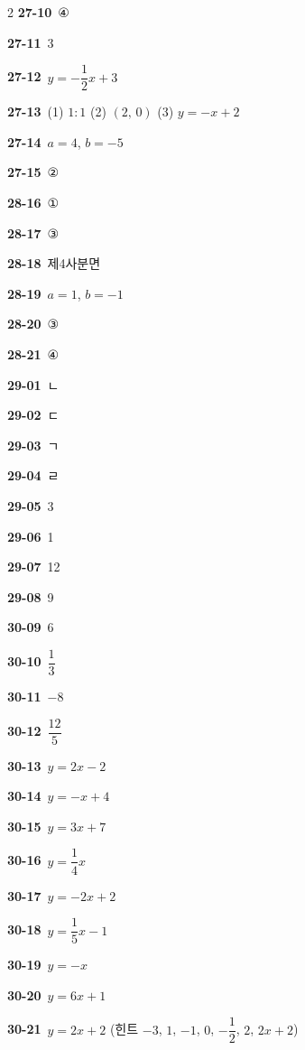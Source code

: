 \documentclass[10pt,a4paper]{article}
\begin{document}
\begin{multicols}{2}
\noindent\textbf{27-10}\ ④\par
\noindent\textbf{27-11}\ 3\par
\noindent\textbf{27-12}\ $y=-\dfrac{1}{2}x+3$\par
\noindent\textbf{27-13}\ (1) $1:1$ (2) $(2,\,0)$ (3) $y=-x+2$\par
\noindent\textbf{27-14}\ $a=4$, $b=-5$\par
\noindent\textbf{27-15}\ ②\par
\noindent\textbf{28-16}\ ①\par
\noindent\textbf{28-17}\ ③\par
\noindent\textbf{28-18}\ 제4사분면\par
\noindent\textbf{28-19}\ $a=1$, $b=-1$\par
\noindent\textbf{28-20}\ ③\par
\noindent\textbf{28-21}\ ④\par
\noindent\textbf{29-01}\ ㄴ\par
\noindent\textbf{29-02}\ ㄷ\par
\noindent\textbf{29-03}\ ㄱ\par
\noindent\textbf{29-04}\ ㄹ\par
\noindent\textbf{29-05}\ 3\par
\noindent\textbf{29-06}\ 1\par
\noindent\textbf{29-07}\ 12\par
\noindent\textbf{29-08}\ 9\par
\noindent\textbf{30-09}\ 6\par
\noindent\textbf{30-10}\ $\dfrac{1}{3}$\par
\noindent\textbf{30-11}\ $-8$\par
\noindent\textbf{30-12}\ $\dfrac{12}{5}$\par
\noindent\textbf{30-13}\ $y=2x-2$\par
\noindent\textbf{30-14}\ $y=-x+4$\par
\noindent\textbf{30-15}\ $y=3x+7$\par
\noindent\textbf{30-16}\ $y=\dfrac{1}{4}x$\par
\noindent\textbf{30-17}\ $y=-2x+2$\par
\noindent\textbf{30-18}\ $y=\dfrac{1}{5}x-1$\par
\noindent\textbf{30-19}\ $y=-x$\par
\noindent\textbf{30-20}\ $y=6x+1$\par
\noindent\textbf{30-21}\ $y=2x+2$ (힌트 $-3$, $1$, $-1$, $0$, $-\dfrac{1}{2}$, $2$, $2x+2$)\par

\end{multicols}
\end{document}
